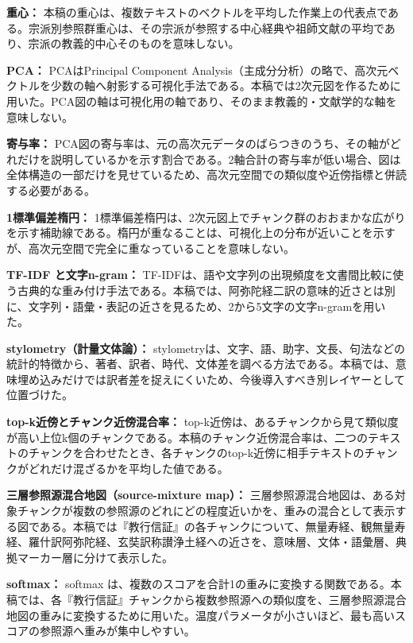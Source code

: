 \documentclass[uplatex,dvipdfmx,11pt,a4paper]{jsarticle}
\begin{document}
\noindent\textbf{重心：} 本稿の重心は、複数テキストのベクトルを平均した作業上の代表点である。宗派別参照群重心は、その宗派が参照する中心経典や祖師文献の平均であり、宗派の教義的中心そのものを意味しない。

\noindent\textbf{PCA：} PCAはPrincipal Component Analysis（主成分分析）の略で、高次元ベクトルを少数の軸へ射影する可視化手法である\cite{jolliffe2002,pedregosa2011}。本稿では2次元図を作るために用いた。PCA図の軸は可視化用の軸であり、そのまま教義的・文献学的な軸を意味しない。

\noindent\textbf{寄与率：} PCA図の寄与率は、元の高次元データのばらつきのうち、その軸がどれだけを説明しているかを示す割合である。2軸合計の寄与率が低い場合、図は全体構造の一部だけを見せているため、高次元空間での類似度や近傍指標と併読する必要がある。

\noindent\textbf{1標準偏差楕円：} 1標準偏差楕円は、2次元図上でチャンク群のおおまかな広がりを示す補助線である。楕円が重なることは、可視化上の分布が近いことを示すが、高次元空間で完全に重なっていることを意味しない。

\noindent\textbf{TF-IDF と文字n-gram：} TF-IDFは、語や文字列の出現頻度を文書間比較に使う古典的な重み付け手法である\cite{salton1988}。本稿では、阿弥陀経二訳の意味的近さとは別に、文字列・語彙・表記の近さを見るため、2から5文字の文字n-gramを用いた。

\noindent\textbf{stylometry（計量文体論）：} stylometryは、文字、語、助字、文長、句法などの統計的特徴から、著者、訳者、時代、文体差を調べる方法である。本稿では、意味埋め込みだけでは訳者差を捉えにくいため、今後導入すべき別レイヤーとして位置づけた。

\noindent\textbf{top-k近傍とチャンク近傍混合率：} top-k近傍は、あるチャンクから見て類似度が高い上位k個のチャンクである。本稿のチャンク近傍混合率は、二つのテキストのチャンクを合わせたとき、各チャンクのtop-k近傍に相手テキストのチャンクがどれだけ混ざるかを平均した値である。

\noindent\textbf{三層参照源混合地図（source-mixture map）：} 三層参照源混合地図は、ある対象チャンクが複数の参照源のどれにどの程度近いかを、重みの混合として表示する図である。本稿では『教行信証』の各チャンクについて、無量寿経、観無量寿経、羅什訳阿弥陀経、玄奘訳称讃浄土経への近さを、意味層、文体・語彙層、典拠マーカー層に分けて表示した。

\noindent\textbf{softmax：} softmax は、複数のスコアを合計1の重みに変換する関数である。本稿では、各『教行信証』チャンクから複数参照源への類似度を、三層参照源混合地図の重みに変換するために用いた。温度パラメータが小さいほど、最も高いスコアの参照源へ重みが集中しやすい。
\end{document}
